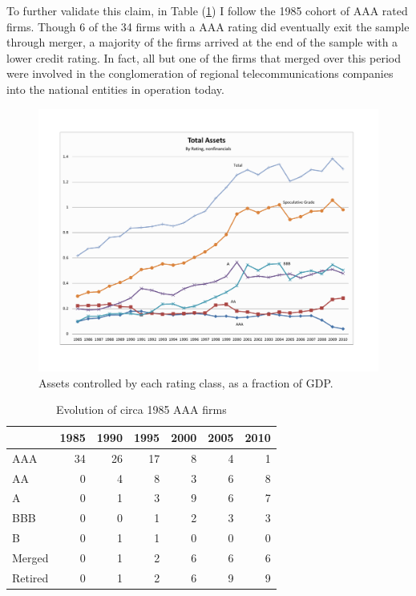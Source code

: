 \documentclass[titlepage]{article}
\begin{document}
To further validate this claim, in Table (\ref{tab:mrg}) I follow the 1985 cohort of AAA rated firms. Though 6 of the 34 firms with a AAA rating did eventually exit the sample through merger, a majority of the firms arrived at the end of the sample with a lower credit rating. In fact, all but one of the firms that merged over this period were involved in the conglomeration of regional telecommunications companies into the national entities in operation today.

\begin{figure}[ht]
\centering
	\includegraphics[width=\textwidth]{assets_nf.pdf}
	\caption{Assets controlled by each rating class, as a fraction of GDP.}
	\label{fig:assets}
\end{figure}

\begin{table}\centering
\begin{tabular}{l *{6}r}
\toprule
  	& 1985  & 1990  & 1995  & 2000  & 2005  & 2010\\ \midrule
AAA  	& 34  	& 26  	& 17  	& 8  	& 4  	& 1\\
AA  	& 0  	& 4  	& 8  	& 3  	& 6  	& 8\\
A  	& 0  	& 1  	& 3  	& 9  	& 6  	& 7\\
BBB  	& 0  	& 0  	& 1  	& 2  	& 3  	& 3\\
B  	& 0  	& 1  	& 1  	& 0  	& 0  	& 0\\
Merged 	& 0  	& 1  	& 2  	& 6  	& 6  	& 6\\
Retired	& 0  	& 1  	& 2  	& 6  	& 9  	& 9\\ 
\bottomrule
\end{tabular}
\caption{Evolution of circa 1985 AAA firms}
\label{tab:mrg}
\end{table}
\end{document}
